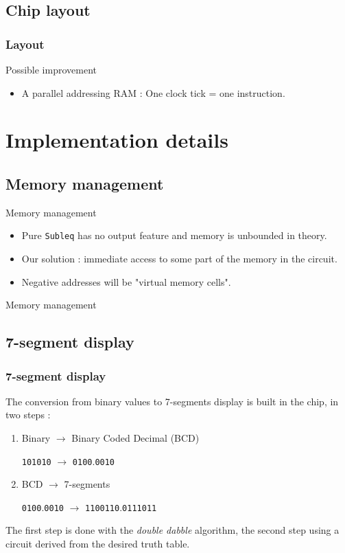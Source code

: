 \documentclass{beamer}
\begin{document}
\subsection{Chip layout}
\begin{frame}
    \frametitle{Layout}
    \centering
    
\end{frame}

\begin{frame}{Possible improvement}
  \begin{itemize}
    \item A parallel addressing RAM : One clock tick = one instruction.
  \end{itemize}
\end{frame}


\section{Implementation details}

\subsection{Memory management}

\begin{frame}{Memory management}
  \begin{itemize}
    \item Pure \texttt{Subleq} has no output feature and memory is
      unbounded in theory. %
    \item<2-> Our solution : immediate access to some part of the memory
      in the circuit.
    \item<3-> Negative addresses will be "virtual memory cells".
  \end{itemize}
\end{frame}

\begin{frame}{Memory management}
	\centering
	
\end{frame}

\subsection{7-segment display}

\begin{frame}
  \frametitle{7-segment display}
  The conversion from binary values to 7-segments display is built
  in the chip, in two steps :
  \begin{enumerate}
    \item<2-> Binary $\rightarrow$ Binary Coded Decimal (BCD)

          \texttt{101010} $\rightarrow$ \texttt{0100}.\texttt{0010}
    \item<3-> BCD $\rightarrow$ 7-segments

        \texttt{0100}.\texttt{0010} $\rightarrow$
        \texttt{1100110}.\texttt{0111011}
\end{enumerate}
The first step is done with the \emph{double dabble} algorithm,
the second step using a circuit derived from the desired truth table.

\end{frame}
\end{document}

